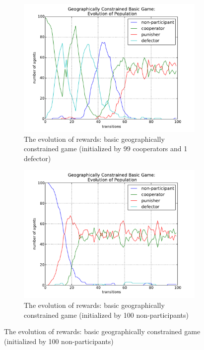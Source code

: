 \documentclass[11pt]{article}
\begin{document}
\begin{figure}[!h]
\begin{subfigure}{.5\textwidth}
   \label{}
   \centering
   \caption{The evolution of rewards: basic geographically constrained game (initialized by 99 cooperators and 1 defector)}
   \includegraphics[scale = 0.4]{6.pdf}
 \end{subfigure}
 \begin{subfigure}{.5\textwidth}
   \centering
   \label{}
   \caption{The evolution of rewards: basic geographically constrained game (initialized by 100 non-participants)}
   \includegraphics[scale = 0.4]{13.pdf}
 \end{subfigure}
\end{figure}
\end{document}
